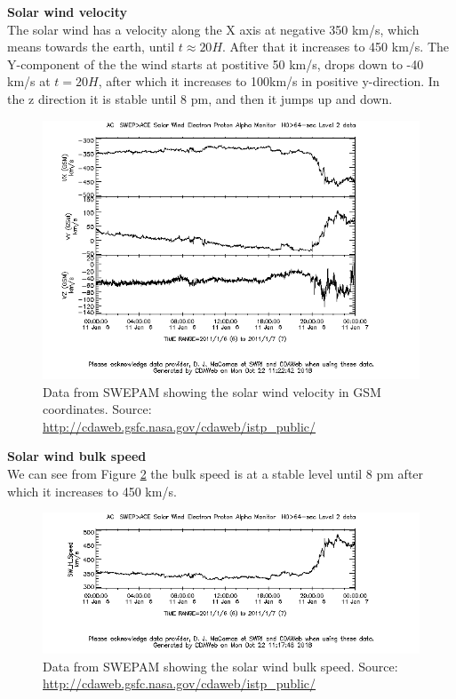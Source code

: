 \documentclass[norsk,a4paper,11pt]{article}
\begin{document}
\begin{multicols}{2}
\textbf{Solar wind velocity}\\
The solar wind has a velocity along the X axis at negative 350 km/s, which means towards the earth, until $t\approx 20 H$. After that it increases to 450 km/s. The Y-component of the the wind starts at postitive 50 km/s, drops down to -40 km/s at $t=20H$, after which it increases to 100km/s in positive y-direction. In the z direction it is stable until 8 pm, and then it jumps up and down.

\begin{figure}[H]
	\includegraphics[scale=0.4]{Figures/ACE_SE_velocityGSM.png}
	\centering
	\caption{Data from SWEPAM showing the solar wind velocity in GSM coordinates. Source: \url{http://cdaweb.gsfc.nasa.gov/cdaweb/istp_public/}}
	\label{fig:SWvelGSM}
\end{figure}


\textbf{Solar wind bulk speed}\\
We can see from Figure \ref{fig:ACE_bulk} the bulk speed is at a stable level until 8 pm after which it increases to 450 km/s.
\begin{figure}[H]
	\includegraphics[scale=0.4]{Figures/ACE_SW_H_Speed.png}
	\centering
	\caption{Data from SWEPAM showing the solar wind bulk speed. Source: \url{http://cdaweb.gsfc.nasa.gov/cdaweb/istp_public/}}
	\label{fig:ACE_bulk}
\end{figure}



\end{multicols}
\end{document}
